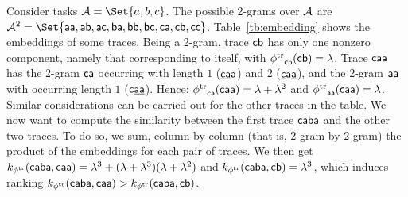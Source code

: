 \begin{example}\label{ex:wheredotiszero} %
Consider tasks $\tasks=\Set{a,b,c}$. The possible 2-grams over $\mathcal{A}$ are $\tasks^2=\Set{\const{aa},\const{ab},\const{ac},\const{ba},\const{bb},\const{bc},\const{ca},\const{cb},\const{cc}}$. Table~\ref{tb:embedding} shows the embeddings of some traces. Being a 2-gram, trace $\mathsf{cb}$ has only one nonzero component, namely that corresponding to itself, with ${\phi^{\text{tr}}}_{\mathsf{cb}}(\mathsf{cb})=\lambda$. Trace $\mathsf{caa}$ has the 2-gram $\mathsf{ca}$ occurring with length $1$ ($\mathsf{\underline{ca}a}$) and $2$ ($\mathsf{\underline{c}a\underline{a}}$), and the 2-gram $\mathsf{aa}$ with occurring length $1$ ($\mathsf{c\underline{aa}}$). Hence: ${\phi^{\text{tr}}}_{\mathsf{ca}}(\mathsf{caa})=\lambda+\lambda^2$ and  ${\phi^{\text{tr}}}_{\mathsf{aa}}(\mathsf{caa})=\lambda$.  Similar considerations can be carried out for the other traces in the table.
We now want to compute the similarity between the first trace $\mathsf{caba}$ and the other two traces. To do so, we sum, column by column (that is, 2-gram by 2-gram) the product of the embeddings for each pair of traces. We then get $k_{{\phi^{\text{tr}}}}(\mathsf{caba},\mathsf{caa})=\lambda^3+(\lambda+\lambda^3)(\lambda+\lambda^2)$ and $k_{{\phi^{\text{tr}}}}(\mathsf{caba},\mathsf{cb})=\lambda^3
$,
which induces ranking $
k_{{\phi^{\text{tr}}}}(\mathsf{caba},\mathsf{caa})>
k_{{\phi^{\text{tr}}}}(\mathsf{caba},\mathsf{cb})
$.
\end{example}

\endinput
\subsection{Graph Embedding}\label{ssec:ge}
Graph kernels allow mapping graph data structures to feature spaces (usually an Euclidean space in $\mathbb{R}^n$ for $n\in \mathbb{N}_{>0}$) \cite{Samatova} so to express graph similarity functions that can then be adopted for both classification \cite{TsudaS10} and clustering algorithms. One of the first approaches used in literature involved the definition of topological description vectors \cite{Sidere} for each graph in a graph database, for then defining the graph similarity function as an inner product of their associated vectors. One inconvenience of such a technique is that it is required to perform NP-complete subgraph isomorphisms among a collection of graphs. It has been already proved that the definition of a graph kernel function fully recognizing the structure the graph always boils down to solving such NP-Complete problem \cite{GartnerFW03}, as exact embeddings generable in polynomial can be inferred just for loop-free Direct Acyclic Graphs \cite{BergamiBM20}.



